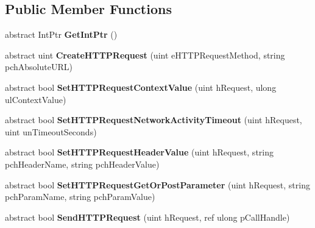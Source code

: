 \subsection*{Public Member Functions}
\begin{DoxyCompactItemize}
\item 
\hypertarget{classValve_1_1Steamworks_1_1ISteamHTTP_a4860af724b6982ddc4e2a6bbacb333e5}{}abstract Int\+Ptr {\bfseries Get\+Int\+Ptr} ()\label{classValve_1_1Steamworks_1_1ISteamHTTP_a4860af724b6982ddc4e2a6bbacb333e5}

\item 
\hypertarget{classValve_1_1Steamworks_1_1ISteamHTTP_a2e886d1dc6b51b8dcf7824d30dd5d526}{}abstract uint {\bfseries Create\+H\+T\+T\+P\+Request} (uint e\+H\+T\+T\+P\+Request\+Method, string pch\+Absolute\+U\+R\+L)\label{classValve_1_1Steamworks_1_1ISteamHTTP_a2e886d1dc6b51b8dcf7824d30dd5d526}

\item 
\hypertarget{classValve_1_1Steamworks_1_1ISteamHTTP_a99579808fe80cd66dad111dafc9db130}{}abstract bool {\bfseries Set\+H\+T\+T\+P\+Request\+Context\+Value} (uint h\+Request, ulong ul\+Context\+Value)\label{classValve_1_1Steamworks_1_1ISteamHTTP_a99579808fe80cd66dad111dafc9db130}

\item 
\hypertarget{classValve_1_1Steamworks_1_1ISteamHTTP_ad0a025bbb725a139e6ca38a690a92984}{}abstract bool {\bfseries Set\+H\+T\+T\+P\+Request\+Network\+Activity\+Timeout} (uint h\+Request, uint un\+Timeout\+Seconds)\label{classValve_1_1Steamworks_1_1ISteamHTTP_ad0a025bbb725a139e6ca38a690a92984}

\item 
\hypertarget{classValve_1_1Steamworks_1_1ISteamHTTP_aa39cf6a78678862ed3ffb8ca55293b6e}{}abstract bool {\bfseries Set\+H\+T\+T\+P\+Request\+Header\+Value} (uint h\+Request, string pch\+Header\+Name, string pch\+Header\+Value)\label{classValve_1_1Steamworks_1_1ISteamHTTP_aa39cf6a78678862ed3ffb8ca55293b6e}

\item 
\hypertarget{classValve_1_1Steamworks_1_1ISteamHTTP_a34772dec6721b108e289be06be296ad8}{}abstract bool {\bfseries Set\+H\+T\+T\+P\+Request\+Get\+Or\+Post\+Parameter} (uint h\+Request, string pch\+Param\+Name, string pch\+Param\+Value)\label{classValve_1_1Steamworks_1_1ISteamHTTP_a34772dec6721b108e289be06be296ad8}

\item 
\hypertarget{classValve_1_1Steamworks_1_1ISteamHTTP_aea9cbcd6efb34f5fd8aa1da317fa4356}{}abstract bool {\bfseries Send\+H\+T\+T\+P\+Request} (uint h\+Request, ref ulong p\+Call\+Handle)\label{classValve_1_1Steamworks_1_1ISteamHTTP_aea9cbcd6efb34f5fd8aa1da317fa4356}


\end{DoxyCompactItemize}
